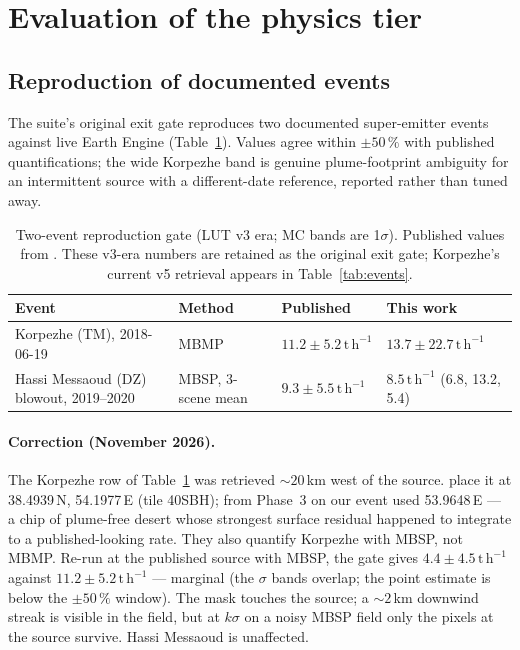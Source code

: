 \documentclass[11pt]{article}
\newcommand{\perh}{\ensuremath{\,\mathrm{t\,h^{-1}}}}
\begin{document}
\section{Evaluation of the physics tier}\label{sec:eval}

\subsection{Reproduction of documented events}\label{sec:gate}

The suite's original exit gate reproduces two documented super-emitter
events against live Earth Engine (Table~\ref{tab:gate}). Values agree
within $\pm50\,\%$ with published quantifications; the wide Korpezhe band
is genuine plume-footprint ambiguity for an intermittent source with a
different-date reference, reported rather than tuned away.

\begin{table}[tb]
\centering\small
\caption{Two-event reproduction gate (LUT v3 era; MC bands are 1$\sigma$).
Published values from \citet{varon2021}. These v3-era numbers are
retained as the original exit gate; Korpezhe's current v5 retrieval
appears in Table~\ref{tab:events}.}
\label{tab:gate}
\begin{tabular}{@{}llll@{}}
\toprule
Event & Method & Published & This work \\
\midrule
Korpezhe (TM), 2018-06-19 & MBMP & $11.2 \pm 5.2\perh$ & $13.7 \pm
22.7\perh$ \\
Hassi Messaoud (DZ) blowout, 2019--2020 & MBSP, 3-scene mean &
$9.3 \pm 5.5\perh$ & $8.5\perh$ (6.8, 13.2, 5.4) \\
\bottomrule
\end{tabular}
\end{table}

\paragraph{Correction (November 2026).} The Korpezhe row of
Table~\ref{tab:gate} was retrieved ${\sim}20$\,km west of the source.
\citet{varon2021} place it at 38.4939\,N, 54.1977\,E (tile 40SBH); from
Phase~3 on our event used 53.9648\,E --- a chip of plume-free desert
whose strongest surface residual happened to integrate to a
published-looking rate. They also quantify Korpezhe
with MBSP, not MBMP. Re-run at the published source with MBSP, the gate
gives $4.4 \pm 4.5\perh$ against $11.2 \pm 5.2\perh$ --- marginal (the
$\sigma$ bands overlap; the point estimate is below the $\pm50\,\%$
window). The mask touches the source; a ${\sim}2$\,km downwind streak
is visible in the field, but at $k\sigma$ on a noisy MBSP field only the
pixels at the source survive. Hassi Messaoud is unaffected.
\end{document}
